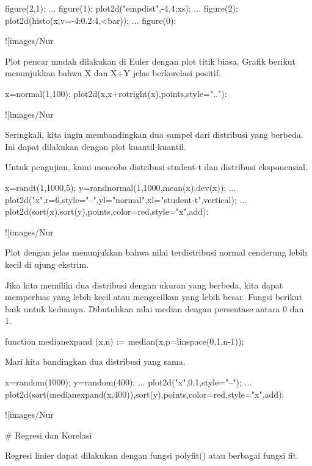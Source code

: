 \documentclass{article}
\begin{document}
\>figure(2,1); ...  
\>   figure(1); plot2d("empdist",-4,4;xs); ...  
\>   figure(2); plot2d(histo(x,v=-4:0.2:4,<bar));  ...  
\>   figure(0):


![images/Nur%

Plot pencar mudah dilakukan di Euler dengan plot titik biasa. Grafik
berikut menunjukkan bahwa X dan X+Y jelas berkorelasi positif.


\>x=normal(1,100); plot2d(x,x+rotright(x),\>points,style=".."):


![images/Nur%

Seringkali, kita ingin membandingkan dua sampel dari distribusi yang
berbeda. Ini dapat dilakukan dengan plot kuantil-kuantil.


Untuk pengujian, kami mencoba distribusi student-t dan distribusi
eksponensial.


\>x=randt(1,1000,5); y=randnormal(1,1000,mean(x),dev(x)); ...  
\>   plot2d("x",r=6,style="--",yl="normal",xl="student-t",\>vertical); ...  
\>   plot2d(sort(x),sort(y),\>points,color=red,style="x",\>add):


![images/Nur%

Plot dengan jelas menunjukkan bahwa nilai terdistribusi normal
cenderung lebih kecil di ujung ekstrim.


Jika kita memiliki dua distribusi dengan ukuran yang berbeda, kita
dapat memperluas yang lebih kecil atau mengecilkan yang lebih besar.
Fungsi berikut baik untuk keduanya. Dibutuhkan nilai median dengan
persentase antara 0 dan 1.


\>function medianexpand (x,n) := median(x,p=linspace(0,1,n-1));


Mari kita bandingkan dua distribusi yang sama.


\>x=random(1000); y=random(400); ...  
\>   plot2d("x",0,1,style="--"); ...  
\>   plot2d(sort(medianexpand(x,400)),sort(y),\>points,color=red,style="x",\>add):


![images/Nur%

# Regresi dan Korelasi

Regresi linier dapat dilakukan dengan fungsi polyfit() atau berbagai
fungsi fit.
\end{document}
